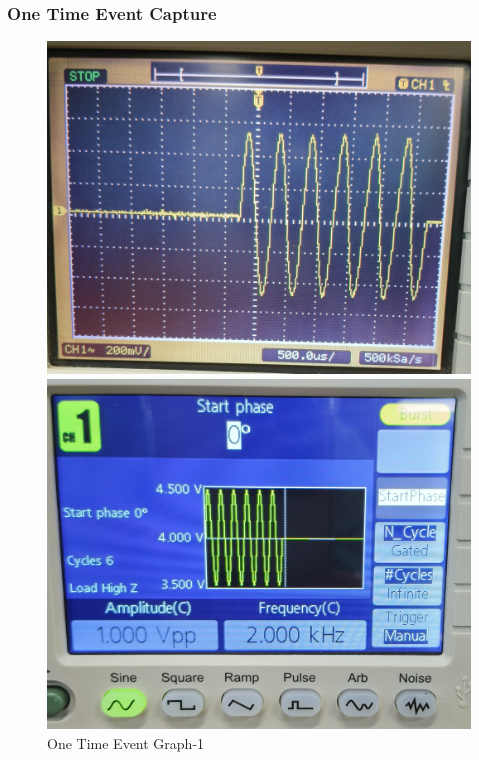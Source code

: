 \documentclass[12pt,a4paper]{report}
\begin{document}
\subsubsection*{One Time Event Capture}
\begin{figure}[H] %
    \centering
    \begin{minipage}[c]{0.48\textwidth}
        \includegraphics[width=\textwidth]{figs/1cro one.jpg} %
        
    \end{minipage}
    \hfill
    \begin{minipage}[c]{0.48\textwidth}
        \includegraphics[width=\textwidth]{figs/1one.jpg} %
        
    \end{minipage}
    \caption{One Time Event Graph-1}
    \label{fig:ONE TIME EVENT}
    \end{figure}
\end{document}
